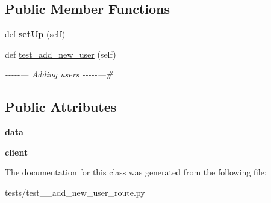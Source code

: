 \subsection*{Public Member Functions}
\begin{DoxyCompactItemize}
\item 
\mbox{\label{classtests_1_1test__1__add__new__user__route_1_1_test_user_routes_aea4e4849bb5076ccc22c20be643e6a0b}} 
def {\bfseries set\+Up} (self)
\item 
\mbox{\label{classtests_1_1test__1__add__new__user__route_1_1_test_user_routes_a7f6feef69e3a930caf8313357219fae1}} 
def \hyperlink{classtests_1_1test__1__add__new__user__route_1_1_test_user_routes_a7f6feef69e3a930caf8313357219fae1}{test\+\_\+add\+\_\+new\+\_\+user} (self)
\begin{DoxyCompactList}\small\item\em -\/-\/-\/-\/-\/--- Adding users -\/-\/-\/-\/-\/---\# \end{DoxyCompactList}\end{DoxyCompactItemize}
\subsection*{Public Attributes}
\begin{DoxyCompactItemize}
\item 
\mbox{\label{classtests_1_1test__1__add__new__user__route_1_1_test_user_routes_ae252557390d4acfdc978bff4b26ffeaa}} 
{\bfseries data}
\item 
\mbox{\label{classtests_1_1test__1__add__new__user__route_1_1_test_user_routes_a3a446edfe4af7dbc375d2ae69ae8bcac}} 
{\bfseries client}
\end{DoxyCompactItemize}


The documentation for this class was generated from the following file\+:\begin{DoxyCompactItemize}
\item 
tests/test\+\_\+\_\+add\+\_\+new\+\_\+user\+\_\+route.\+py\end{DoxyCompactItemize}
